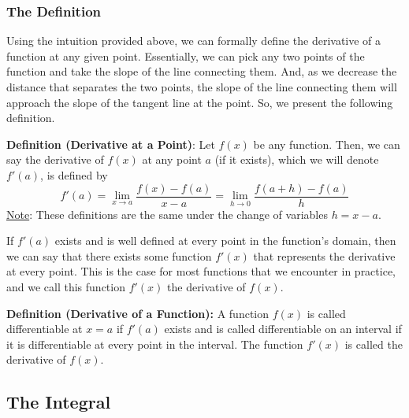 \documentclass[8pt]{extarticle}
\begin{document}
\subsubsection{The Definition}
Using the intuition provided above, we can formally define the derivative of a function at any given point. Essentially, we can pick any two points of the function and take the slope of the line connecting them. And, as we decrease the distance that separates the two points, the slope of the line connecting them will approach the slope of the tangent line at the point. So, we present the following definition.
\begin{boxedsection}
\textbf{Definition (Derivative at a Point)}: Let $f(x)$ be any function. Then, we can say the derivative of $f(x)$ at any point $a$ (if it exists), which we will denote $f'(a)$, is defined by
$$
f'(a) = \lim_{x \rightarrow a} \frac{f(x) - f(a)}{x-a} = \lim_{h \rightarrow 0} \frac{f(a+h) - f(a)}{h}
$$
\underline{Note}: These definitions are the same under the change of variables $h = x -a$. 
\end{boxedsection}
If $f'(a)$ exists and is well defined at every point in the function's domain, then we can say that there exists some function $f'(x)$ that represents the derivative at every point. This is the case for most functions that we encounter in practice, and we call this function $f'(x)$ the derivative of $f(x)$.
\begin{boxedsection}
\textbf{Definition (Derivative of a Function):} A function $f(x)$ is called differentiable at $x=a$ if $f'(a)$ exists and is called differentiable on an interval if it is differentiable at every point in the interval. The function $f'(x)$ is called the derivative of $f(x)$.
\end{boxedsection}
\subsection{The Integral}
\end{document}
